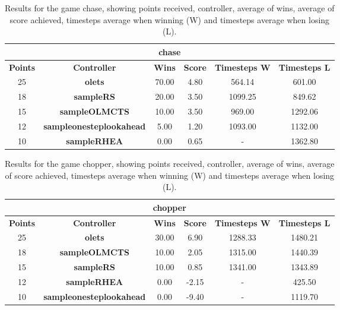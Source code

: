 \begin{table*}[!t]
\begin{center}
\begin{tabular}{|c|c|c|c|c|c|}
\multicolumn{6}{c}{\textbf{chase}}\\
\hline
\textbf{Points} & \textbf{Controller} & \textbf{Wins} &  \textbf{Score} & \textbf{Timesteps W} & \textbf{Timesteps L}\\
\hline
25 & \textbf{olets} & 70.00 & 4.80 & 564.14 & 601.00
 \\
\hline
18 & \textbf{sampleRS} & 20.00 & 3.50 & 1099.25 & 849.62
 \\
\hline
15 & \textbf{sampleOLMCTS} & 10.00 & 3.50 & 969.00 & 1292.06
 \\
\hline
12 & \textbf{sampleonesteplookahead} & 5.00 & 1.20 & 1093.00 & 1132.00
 \\
\hline
10 & \textbf{sampleRHEA} & 0.00 & 0.65 &  -  & 1362.80
 \\
\hline
\end{tabular}
\caption{Results for the game chase, showing points received, controller, average of wins, average of score achieved, timesteps average when winning (W) and timesteps average when losing (L).}
\label{tab:weights}
\end{center}
\end{table*}
\begin{table*}[!t]
\begin{center}
\begin{tabular}{|c|c|c|c|c|c|}
\multicolumn{6}{c}{\textbf{chopper}}\\
\hline
\textbf{Points} & \textbf{Controller} & \textbf{Wins} &  \textbf{Score} & \textbf{Timesteps W} & \textbf{Timesteps L}\\
\hline
25 & \textbf{olets} & 30.00 & 6.90 & 1288.33 & 1480.21
 \\
\hline
18 & \textbf{sampleOLMCTS} & 10.00 & 2.05 & 1315.00 & 1440.39
 \\
\hline
15 & \textbf{sampleRS} & 10.00 & 0.85 & 1341.00 & 1343.89
 \\
\hline
12 & \textbf{sampleRHEA} & 0.00 & -2.15 &  -  & 425.50
 \\
\hline
10 & \textbf{sampleonesteplookahead} & 0.00 & -9.40 &  -  & 1119.70
 \\
\hline
\end{tabular}
\caption{Results for the game chopper, showing points received, controller, average of wins, average of score achieved, timesteps average when winning (W) and timesteps average when losing (L).}
\label{tab:weights}
\end{center}
\end{table*}
